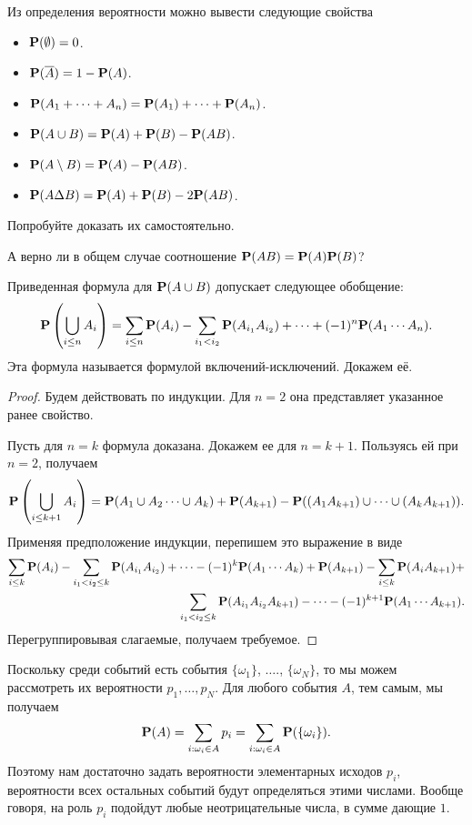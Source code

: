 \documentclass[11 pt,russian]{article}
\begin{document}
Из определения вероятности можно вывести следующие свойства
\begin{itemize}
\item ${\bf P}(\emptyset) = 0$.
\item ${\bf P}(\overline{A}) = 1 - {\bf P}(A)$.
\item ${\bf P}(A_1+ \dotsb + A_n) = {\bf P}(A_1) + \dotsb + {\bf P}(A_n)$.
\item ${\bf P}(A\cup B) = {\bf P}(A) + {\bf P}(B) - {\bf P}(AB)$.
\item ${\bf P}(A\setminus B) = {\bf P}(A) - {\bf P}(AB)$.
\item ${\bf P}(A\Delta B) = {\bf P}(A) + {\bf P}(B) - 2{\bf P}(AB)$.
\end{itemize}
Попробуйте доказать их самостоятельно. 
\begin{Que}
А верно ли в общем случае соотношение ${\bf P}(AB) = {\bf P}(A) {\bf P}(B)$?
\end{Que}
Приведенная формула для ${\bf P}(A\cup B)$ допускает следующее обобщение:
$$
{\bf P}\left(\bigcup_{i\le n} A_i\right) = \sum_{i\le n} {\bf P}(A_i) - \sum_{i_1< i_2} {\bf P}(A_{i_1} A_{i_2}) + \cdots + (-1)^n{\bf P}(A_1 \cdots A_n).
$$
Эта формула называется формулой включений-исключений. Докажем её.
\begin{proof}
Будем действовать по индукции. Для $n=2$ она представляет указанное ранее свойство.

Пусть для $n=k$ формула доказана. Докажем ее для $n=k+1$. Пользуясь ей при $n=2$, получаем
$$
{\bf P}\left(\bigcup_{i\le k+1} A_i\right) = 
{\bf P}(A_1\cup A_2 \dotsm \cup A_{k}) + {\bf P}(A_{k+1}) - {\bf P}((A_1 A_{k+1})\cup \dotsm \cup (A_{k}A_{k+1})).
$$
Применяя предположение индукции, перепишем это выражение в виде
\begin{eqnarray*}
 \sum_{i\le k} {\bf P}(A_i) - \sum_{i_1< i_2\le k} {\bf P}(A_{i_1} A_{i_2})  + \dotsb - (-1)^{k} {\bf P}(A_1 \dotsm A_{k}) + {\bf P}(A_{k+1}) - 
 \sum_{i\le k} {\bf P}(A_i A_{k+1}) +\\
  \sum_{i_1< i_2\le k} {\bf P}(A_{i_1} A_{i_2} A_{k+1})  - \dotsb - (-1)^{k+1} {\bf P}(A_1 \dotsm A_{k+1}).
\end{eqnarray*}
Перегруппировывая слагаемые, получаем требуемое.
\end{proof}
Поскольку среди событий есть события $\{\omega_1\}$, $\dotsc$., $\{\omega_N\}$, то мы можем рассмотреть их вероятности $p_1,\dotsc, p_N$. Для любого события $A$, тем самым, мы получаем
$$
{\bf P}(A) = \sum_{i: \omega_i\in A} p_i = \sum_{i: \omega_i\in A} {\bf P}(\{\omega_i\}).
$$
Поэтому нам достаточно задать вероятности элементарных исходов $p_i$, вероятности всех остальных событий будут определяться этими числами. Вообще говоря, на роль $p_i$ подойдут любые неотрицательные числа, в сумме дающие $1$.
\end{document}

